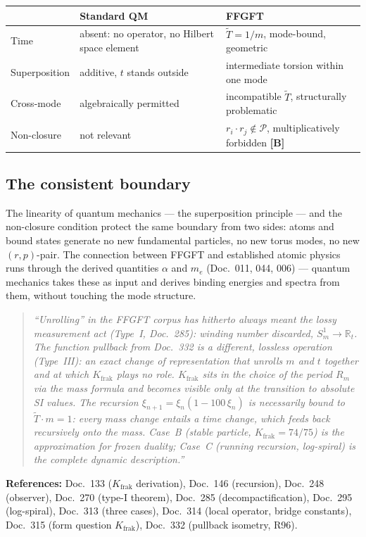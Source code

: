 \begin{center}
\begin{tabular}{lp{4.2cm}p{4.2cm}}
\toprule
 & \textbf{Standard QM} & \textbf{FFGFT} \\
\midrule
Time & absent: no operator, no Hilbert space element & $\tilde{T}=1/m$, mode-bound, geometric \\
Superposition & additive, $t$ stands outside & intermediate torsion
  within one mode \\
Cross-mode & algebraically permitted & incompatible $\tilde{T}$,
  structurally problematic \\
Non-closure & not relevant & $r_i\cdot r_j\notin\mathcal{P}$,
  multiplicatively forbidden \textbf{[B]} \\
\bottomrule
\end{tabular}
\end{center}

\subsection{The consistent boundary}

The linearity of quantum mechanics — the superposition principle —
and the non-closure condition protect the same boundary from two
sides: atoms and bound states generate no new fundamental particles,
no new torus modes, no new $(r,p)$-pair. The connection between
FFGFT and established atomic physics runs through the derived
quantities $\alpha$ and $m_e$ (Doc.~011, 044, 006) — quantum
mechanics takes these as input and derives binding energies and
spectra from them, without touching the mode structure.

\begin{quote}
\emph{``Unrolling'' in the FFGFT corpus has hitherto always meant the
lossy measurement act (Type~I, Doc.~285): winding number discarded,
$S^1_m\to\mathbb{R}_t$. The function pullback from Doc.~332 is a
different, lossless operation (Type~III): an exact change of
representation that unrolls $m$ and $t$ together and at which
$K_{\text{frak}}$ plays no role. $K_{\text{frak}}$ sits in the choice
of the period $R_m$ via the mass formula and becomes visible only at
the transition to absolute SI values. The recursion
$\xi_{n+1}=\xi_n(1-100\,\xi_n)$ is necessarily bound to
$\tilde{T}\cdot m=1$: every mass change entails a time change, which
feeds back recursively onto the mass. Case~B (stable particle,
$K_{\text{frak}}=74/75$) is the approximation for frozen duality;
Case~C (running recursion, log-spiral) is the complete dynamic
description.''}
\end{quote}

\medskip\noindent
\textbf{References:} Doc.~133 ($K_{\text{frak}}$ derivation),
Doc.~146 (recursion), Doc.~248 (observer),
Doc.~270 (type-I theorem), Doc.~285 (decompactification),
Doc.~295 (log-spiral), Doc.~313 (three cases),
Doc.~314 (local operator, bridge constants),
Doc.~315 (form question $K_{\text{frak}}$),
Doc.~332 (pullback isometry, R96).
